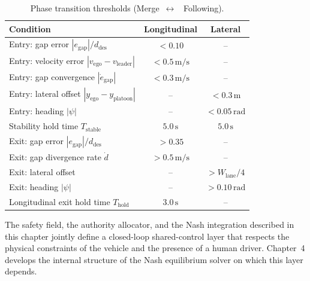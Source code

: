 \documentclass[12pt,a4paper,oneside]{report}
\begin{document}
\begin{table}[H]
\centering
\caption{Phase transition thresholds (Merge~$\leftrightarrow$~  Following).}
\label{tab:phase_transitions_summary}
\begin{tabular}{lcc}
\hline
\textbf{Condition} & \textbf{Longitudinal} & \textbf{Lateral} \\
\hline
Entry: gap error $|e_{\mathrm{gap}}|/d_{\mathrm{des}}$  & $< 0.10$           & --                     \\
Entry: velocity error $|v_{\mathrm{ego}} - v_{\mathrm{leader}}|$ & $< 0.5\,\mathrm{m/s}$ & --          \\
Entry: gap convergence $|\dot{e}_{\mathrm{gap}}|$       & $< 0.3\,\mathrm{m/s}$ & --                  \\
Entry: lateral offset $|y_{\mathrm{ego}} - y_{\mathrm{platoon}}|$ & --      & $< 0.3\,\mathrm{m}$    \\
Entry: heading $|\psi|$                                 & --                 & $< 0.05\,\mathrm{rad}$ \\
Stability hold time $T_{\mathrm{stable}}$               & $5.0\,\mathrm{s}$  & $5.0\,\mathrm{s}$      \\
\hline
Exit: gap error $|e_{\mathrm{gap}}|/d_{\mathrm{des}}$   & $> 0.35$           & --                     \\
Exit: gap divergence rate $\dot{d}$                     & $> 0.5\,\mathrm{m/s}$ & --                 \\
Exit: lateral offset                                    & --                 & $> W_{\mathrm{lane}}/4$ \\
Exit: heading $|\psi|$                                  & --                 & $> 0.10\,\mathrm{rad}$ \\
Longitudinal exit hold time $T_{\mathrm{hold}}$         & $3.0\,\mathrm{s}$  & --                     \\
\hline
\end{tabular}
\end{table}

The safety field, the authority allocator, and the Nash integration described in this chapter jointly define a closed-loop shared-control layer that respects the physical constraints of the vehicle and the presence of a human driver. Chapter~4 develops the internal structure of the Nash equilibrium solver on which this layer depends.


\end{document}
